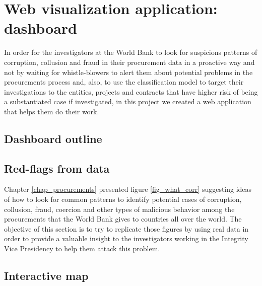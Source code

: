 \section{Web visualization application: dashboard} \label{sec_visual}

In order for the investigators at the World Bank to look for suspicions patterns of corruption, collusion and fraud in their procurement data in a proactive way and not by waiting for whistle-blowers to alert them about potential  problems in the procurements process and, also, to use the classification model to target their investigations to the entities, projects and contracts that have higher risk of being a substantiated case if investigated, in this project we created a web application that helps them do their work.

\subsection{Dashboard outline}


\subsection{Red-flags from data}

Chapter \ref{chap_procurements} presented figure \ref{fig_what_corr} suggesting ideas of how to look for common patterns to identify potential cases of corruption, collusion, fraud, coercion and other types of malicious behavior among the procurements that the World Bank gives to countries all over the world. The objective of this section is to try to replicate those figures by using real data in order to provide a valuable insight to the investigators working in the Integrity Vice Presidency to help them attack this problem.

\subsection{Interactive map}

